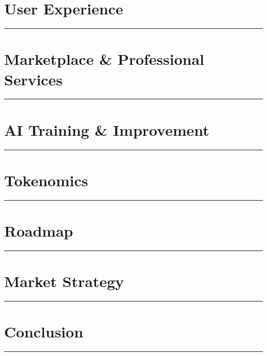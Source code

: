 \documentclass[11pt,a4paper]{article}
\newcommand{\sectionrule}{\noindent\rule{\linewidth}{0.8pt}}
\begin{document}
\clearpage
\section{User Experience}
\sectionrule


\clearpage
\section{Marketplace \& Professional Services}
\sectionrule


\clearpage
\section{AI Training \& Improvement}
\sectionrule


\clearpage
\section{Tokenomics}
\sectionrule


\clearpage
\section{Roadmap}
\sectionrule


\clearpage
\section{Market Strategy}
\sectionrule


\clearpage
\section{Conclusion}
\sectionrule

\end{document}
